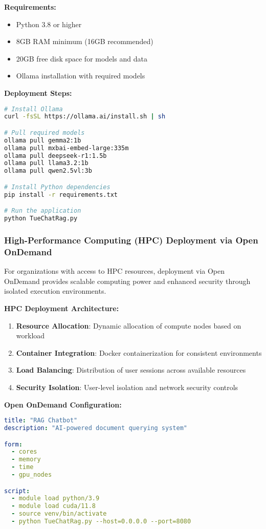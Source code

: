 \textbf{Requirements:}
\begin{itemize}
    \item Python 3.8 or higher
    \item 8GB RAM minimum (16GB recommended)
    \item 20GB free disk space for models and data
    \item Ollama installation with required models
\end{itemize}

\textbf{Deployment Steps:}
\begin{lstlisting}[language=bash, caption=Local PC Deployment Commands]
# Install Ollama
curl -fsSL https://ollama.ai/install.sh | sh

# Pull required models
ollama pull gemma2:1b
ollama pull mxbai-embed-large:335m
ollama pull deepseek-r1:1.5b
ollama pull llama3.2:1b
ollama pull qwen2.5vl:3b

# Install Python dependencies
pip install -r requirements.txt

# Run the application
python TueChatRag.py
\end{lstlisting}

\subsubsection{High-Performance Computing (HPC) Deployment via Open OnDemand}

For organizations with access to HPC resources, deployment via Open OnDemand provides scalable computing power and enhanced security through isolated execution environments.

\textbf{HPC Deployment Architecture:}
\begin{enumerate}
    \item \textbf{Resource Allocation}: Dynamic allocation of compute nodes based on workload
    \item \textbf{Container Integration}: Docker containerization for consistent environments
    \item \textbf{Load Balancing}: Distribution of user sessions across available resources
    \item \textbf{Security Isolation}: User-level isolation and network security controls
\end{enumerate}

\textbf{Open OnDemand Configuration:}
\begin{lstlisting}[language=yaml, caption=Open OnDemand Application Configuration]
title: "RAG Chatbot"
description: "AI-powered document querying system"

form:
  - cores
  - memory
  - time
  - gpu_nodes

script:
  - module load python/3.9
  - module load cuda/11.8
  - source venv/bin/activate
  - python TueChatRag.py --host=0.0.0.0 --port=8080
\end{lstlisting}

